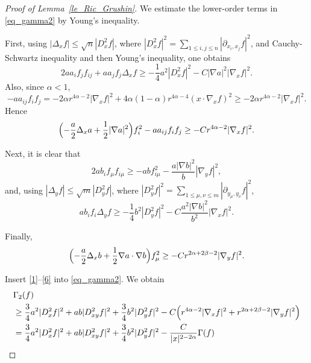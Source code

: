 \documentclass[10pt,a4paper]{amsart}
\begin{document}
\begin{proof}[Proof of Lemma~\ref{le_Ric_Grushin}]
We estimate the lower-order terms in \eqref{eq_gamma2} by Young's inequality.

First, using $|\Delta_x f|\le \sqrt n|D_x^2 f|$, where $|D_x^2f|^2 = \sum_{1\le i,j\le n}|\partial_{x_i,x_j}f|^2$, and Cauchy-Schwartz inequality and then Young's inequality, one obtains
\begin{equation}\label{1}
    2a a_i f_j f_{ij} + a a_j f_j \Delta_x f \ge
-\frac14 a^2|D_x^2 f|^2-C|\nabla a|^2|\nabla_x f|^2.
\end{equation}
Also, since $\alpha<1$,
\begin{equation}\label{2}
-a a_{ij}f_i f_j = -2\alpha r^{4\alpha-2}|\nabla_x f|^2 + 4\alpha(1-\alpha)r^{4\alpha-4}(x\cdot \nabla_x f)^2
\ge -2\alpha r^{4\alpha-2}|\nabla_x f|^2.
\end{equation}
Hence
\begin{equation}\label{3}
    \Bigl(-\frac a2 \Delta_x a + \frac12| \nabla a|^2\Bigr)f_i^2-a a_{ij}f_i f_j \ge
-C r^{4\alpha-2}|\nabla_x f|^2.
\end{equation}

Next, it is clear that
\begin{equation}\label{4}
    2a b_i f_\mu f_{i\mu}
\ge
-a b f_{i\mu}^2-\frac{a|\nabla b|^2}{b} |\nabla_y f|^2,
\end{equation}
and, using $|\Delta_y f|\le \sqrt m|D_y^2 f|$, where $|D_y^2f|^2 = \sum_{1\le \mu,\nu\le m}|\partial_{y_\mu,y_\nu}f|^2$, 
\begin{equation}\label{5}
    a b_i f_i \Delta_y f \ge -\frac14 b^2|D_y^2 f|^2 - C \frac{a^2|\nabla b|^2}{b^2}|\nabla_x f|^2.
\end{equation}

Finally,
\begin{equation}\label{6}
    \Bigl( -\frac a2 \Delta_x b + \frac12 \nabla a \cdot \nabla b \Bigr) f_\mu^2 \ge
 -  C r^{2\alpha+2\beta-2}|\nabla_y f|^2.
\end{equation}

Insert \eqref{1}--\eqref{6} into \eqref{eq_gamma2}. 
We obtain
\begin{align}\label{7}
{}&\Gamma_2(f)\\ \nonumber
&\ge \frac34 a^2|D_x^2 f|^2 + ab|D_{xy}^2 f|^2 + \frac34 b^2|D_y^2 f|^2 - C \Bigl(r^{4\alpha-2}|\nabla_x f|^2 + r^{2\alpha+2\beta-2}|\nabla_y f|^2\Bigr)\\ \nonumber
&= \frac34 a^2|D_x^2 f|^2 + ab|D_{xy}^2 f|^2 + \frac34 b^2|D_y^2 f|^2 -\frac{C}{|x|^{2-2\alpha}}\Gamma(f)
\end{align}


\end{proof}
\end{document}
